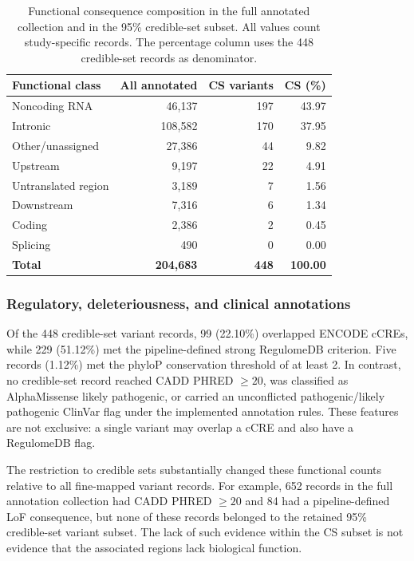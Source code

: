\documentclass[11pt,a4paper]{article}
\begin{document}
\begin{table}[htbp]
\centering
\small
\caption{Functional consequence composition in the full
annotated collection and in the 95\% credible-set subset.
All values count study-specific records. The percentage column
uses the 448 credible-set records as denominator.}
\label{tab:step08_category_overall}
\begin{tabular}{@{}lrrr@{}}
\toprule
Functional class & All annotated & CS variants & CS (\%) \\
\midrule
Noncoding RNA & 46,137 & 197 & 43.97 \\
Intronic & 108,582 & 170 & 37.95 \\
Other/unassigned & 27,386 & 44 & 9.82 \\
Upstream & 9,197 & 22 & 4.91 \\
Untranslated region & 3,189 & 7 & 1.56 \\
Downstream & 7,316 & 6 & 1.34 \\
Coding & 2,386 & 2 & 0.45 \\
Splicing & 490 & 0 & 0.00 \\
\midrule
\textbf{Total} & \textbf{204,683} & \textbf{448} & \textbf{100.00} \\
\bottomrule
\end{tabular}
\end{table}

\subsubsection{Regulatory, deleteriousness, and clinical annotations}

Of the 448 credible-set variant records, 99 (22.10\%)
overlapped ENCODE cCREs, while 229 (51.12\%)
met the pipeline-defined strong RegulomeDB criterion.
Five records (1.12\%) met the phyloP conservation
threshold of at least 2. In contrast, no credible-set
record reached CADD PHRED $\geq20$, was classified
as AlphaMissense likely pathogenic, or carried an
unconflicted pathogenic/likely pathogenic ClinVar flag
under the implemented annotation rules.
These features are not exclusive: a single variant
may overlap a cCRE and also have a RegulomeDB flag.

The restriction to credible sets substantially changed
these functional counts relative to all fine-mapped
variant records. For example, 652 records in the full
annotation collection had CADD PHRED $\geq20$ and
84 had a pipeline-defined LoF consequence, but none
of these records belonged to the retained 95\%
credible-set variant subset. The lack of such evidence
within the CS subset is not evidence that the associated
regions lack biological function.
\end{document}
